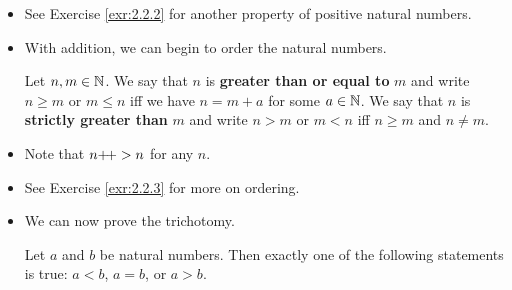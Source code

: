 \documentclass[../main.tex]{subfiles}
\begin{document}
\begin{itemize}
\begin{prp}
        If $a$ is positive and $b$ is a natural number, then $a+b$ is positive (and hence $b+a$ is also by Proposition \ref{prp:commutativity}).
        \begin{proof}
            We induct on $b$ (keeping $a$ fixed). In the base case, if $b=0$, then $a+0=a$ (a positive number) by Lemma \ref{lem:nplus0}. Suppose inductively that $a+b$ is positive. Then $a+(b\pplus)=(a+b)\pplus$ by Lemma \ref{lem:nplusmpplus}, and $(a+b)\pplus$ is positive by Axiom \ref{axm:0NotSuccessor} --- $a+(b\pplus)$ is equal to the successor of a natural number, and the successor of a natural number is never 0, thus always positive. This closes the induction.
        \end{proof}
    \end{prp}
    \begin{cly}\label{cly:AplusBequals0}
        If $a,b\in\N$ and $a+b=0$, then $a=0$ and $b=0$.
        \begin{proof}
            Suppose for the sake of contradiction that $a\neq 0$ or $b\neq 0$. If $a\neq 0$, then $a$ is positive, and hence $a+b=0$ is positive by Proposition \ref{prp:AplusBpositive}, a contradiction. Similarly, if $b\neq 0$, then $b$ is positive, and hence $a+b=0$ is positive by Proposition \ref{prp:AplusBpositive}, a contradiction. Thus, $a$ and $b$ must both be zero.
        \end{proof}
    \end{cly}
    \item See Exercise \ref{exr:2.2.2} for another property of positive natural numbers.
    \item With addition, we can begin to order the natural numbers.
    \begin{dfn}\label{dfn:ordering}
        Let $n,m\in\mathbb{N}$. We say that $n$ is \textbf{greater than or equal to} $m$ and write $n\geq m$ or $m\leq n$ iff we have $n=m+a$ for some $a\in\mathbb{N}$. We say that $n$ is \textbf{strictly greater than} $m$ and write $n>m$ or $m<n$ iff $n\geq m$ and $n\neq m$.
    \end{dfn}
    \item Note that $n{+\!+}>n$ for any $n$.
    \item See Exercise \ref{exr:2.2.3} for more on ordering.
    \item We can now prove the trichotomy.
    \begin{prp}\label{prp:trichotomy}
        Let $a$ and $b$ be natural numbers. Then exactly one of the following statements is true: $a<b$, $a=b$, or $a>b$.

\end{prp}
\end{itemize}
\end{document}
